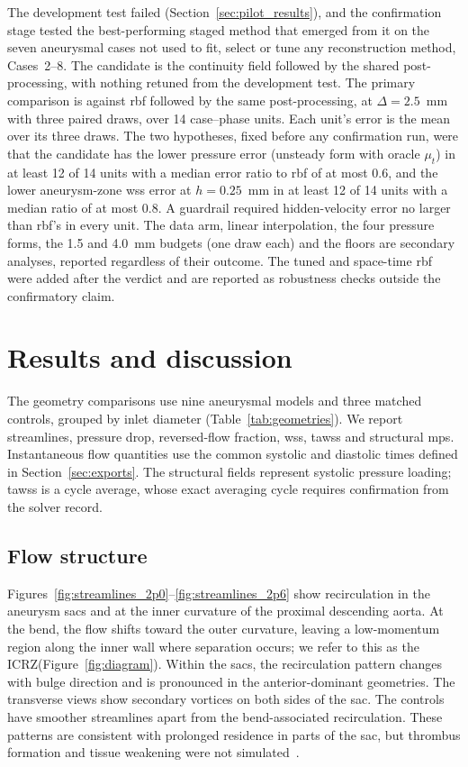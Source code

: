 \documentclass[12pt,a4paper]{article}
\newcommand{\WSS}{\ac{wss}\xspace}
\newcommand{\TAWSS}{\ac{tawss}\xspace}
\newcommand{\MPS}{\ac{mps}\xspace}
\newcommand{\ICRZ}{\ac{ICRZ}\xspace}
\newcommand{\RBF}{\ac{rbf}\xspace}
\theoremstyle{definition}
\numberwithin{equation}{section}
\begin{document}
The development test failed (Section~\ref{sec:pilot_results}), and the confirmation stage tested the best-performing staged method that emerged from it on the seven aneurysmal cases not used to fit, select or tune any reconstruction method, Cases~2--8. The candidate is the continuity field followed by the shared post-processing, with nothing retuned from the development test. The primary comparison is against \RBF followed by the same post-processing, at $\Delta=2.5$~mm with three paired draws, over 14 case--phase units. Each unit's error is the mean over its three draws. The two hypotheses, fixed before any confirmation run, were that the candidate has the lower pressure error (unsteady form with oracle $\mu_t$) in at least 12 of 14 units with a median error ratio to \RBF of at most 0.6, and the lower aneurysm-zone \WSS error at $h=0.25$~mm in at least 12 of 14 units with a median ratio of at most 0.8. A guardrail required hidden-velocity error no larger than \RBF's in every unit. The data arm, linear interpolation, the four pressure forms, the 1.5 and 4.0~mm budgets (one draw each) and the floors are secondary analyses, reported regardless of their outcome. The tuned and space-time \RBF were added after the verdict and are reported as robustness checks outside the confirmatory claim.

\section{\label{Results and Discussions}Results and discussion}
\label{sec:cfd_results}
The geometry comparisons use nine aneurysmal models and three matched controls, grouped by inlet diameter (Table~\ref{tab:geometries}). We report streamlines, pressure drop, reversed-flow fraction, \WSS, \TAWSS and structural \MPS. Instantaneous flow quantities use the common systolic and diastolic times defined in Section~\ref{sec:exports}. The structural fields represent systolic pressure loading; \TAWSS is a cycle average, whose exact averaging cycle requires confirmation from the solver record.


\subsection{Flow structure}
Figures~\ref{fig:streamlines_2p0}--\ref{fig:streamlines_2p6} show recirculation in the aneurysm sacs and at the inner curvature of the proximal descending aorta. At the bend, the flow shifts toward the outer curvature, leaving a low-momentum region along the inner wall where separation occurs; we refer to this as the \ICRZ (Figure~\ref{fig:diagram}). Within the sacs, the recirculation pattern changes with bulge direction and is pronounced in the anterior-dominant geometries. The transverse views show secondary vortices on both sides of the sac. The controls have smoother streamlines apart from the bend-associated recirculation. These patterns are consistent with prolonged residence in parts of the sac, but thrombus formation and tissue weakening were not simulated~\cite{salman2019biomechanical}.
\end{document}
